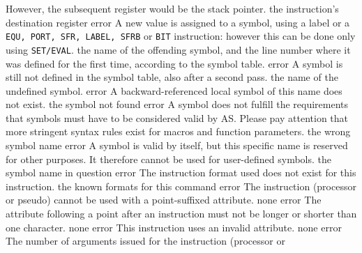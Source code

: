 \documentclass[12pt,twoside]{report}
\newcommand{\tty}[1]{{\tt #1}}
\newcommand{\asname}{{AS}}
\begin{document}
\begin{description}
{                However, the subsequent register would be the stack pointer.}
               {the instruction's destination register}
               {error}
               {A new value is assigned to a symbol, using a label or a
                \tty{EQU, PORT, SFR, LABEL, SFRB} or \tty{BIT} instruction: however this
                can be done only using \tty{SET/EVAL}.}
               {the name of the offending symbol, and the line number where
                it was defined for the first time, according to the symbol
                table.}
               {error}
               {A symbol is still not defined in the symbol table, also
                after a second pass.}
               {the name of the undefined symbol.}
               {error}
               {A backward-referenced local symbol of this
                name does not exist.}
               {the symbol not found}
               {error}
               {A symbol does not fulfill the requirements that symbols
                must have to be considered valid by \asname{}. Please pay
                attention that more stringent syntax rules exist for
                macros and function parameters.}
               {the wrong symbol name}
               {error}
               {A symbol is valid by itself, but this specific name is reserved
                for other purposes.  It therefore cannot be used for user-defined
                symbols.}
               {the symbol name in question}
               {error}
               {The instruction format used does not exist for this
                instruction.}
               {the known formats for this command}
               {error}
               {The instruction (processor or pseudo) cannot be used with a
                point-suffixed attribute.}
               {none}
               {error}
               {The attribute following a point after an instruction must
                not be longer or shorter than one character.}
               {none}
               {error}
               {This instruction uses an invalid attribute.}
               {none}
               {error}
               {The number of arguments issued for the instruction (processor or
}
\end{description}
\end{document}
